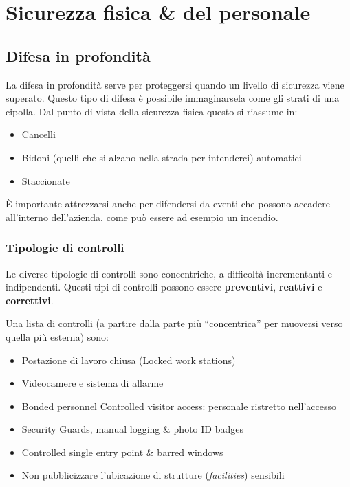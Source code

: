 \part{Sicurezza fisica \& del personale}

\chapter{Difesa in profondità}

La difesa in profondità serve per proteggersi quando un livello di sicurezza 
viene superato. Questo tipo di difesa è possibile immaginarsela come gli strati 
di una cipolla. Dal punto di vista della sicurezza fisica questo si riassume in:
\begin{itemize}
\item Cancelli
\item Bidoni (quelli che si alzano nella strada per intenderci) automatici
\item Staccionate
\end{itemize}

È importante attrezzarsi anche per difendersi da eventi che possono accadere 
all'interno dell'azienda, come può essere ad esempio un incendio.

\section{Tipologie di controlli}

Le diverse tipologie di controlli sono concentriche, a difficoltà incrementanti e 
indipendenti. Questi tipi di controlli possono essere \textbf{preventivi}, 
\textbf{reattivi} e \textbf{correttivi}.

Una lista di controlli (a partire dalla parte più ``concentrica'' per muoversi 
verso quella più esterna) sono:

\begin{itemize}
\item Postazione di lavoro chiusa (Locked work stations)
\item Videocamere e sistema di allarme
\item Bonded personnel Controlled visitor access: personale ristretto 
nell'accesso
\item Security Guards, manual logging \& photo ID badges
\item Controlled single entry point \& barred windows
\item Non pubblicizzare l'ubicazione di strutture (\textit{facilities})
sensibili
\end{itemize}


